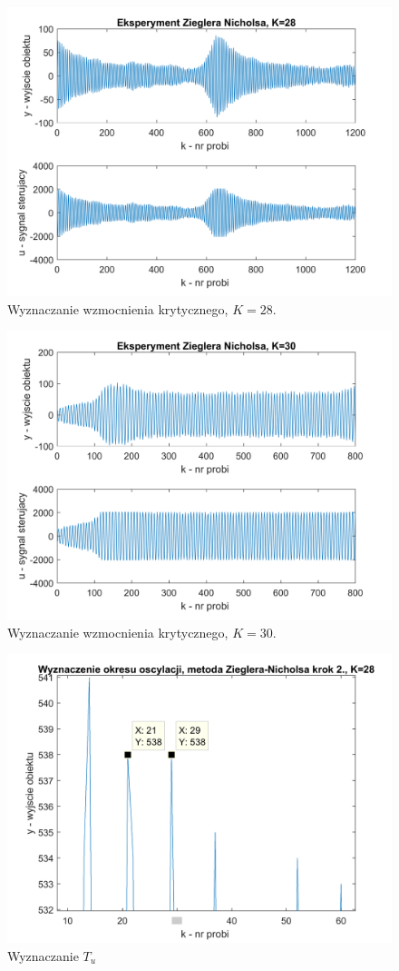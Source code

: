 \documentclass[a4paper, 10pt]{article}
\begin{document}
\begin{figure}[H]
	\centering
	\includegraphics[width=0.9\linewidth]{EZN281}
	\caption{Wyznaczanie wzmocnienia krytycznego, $K = 28$.}
	\label{fig:EZN28}
\end{figure}

\begin{figure}[H]
	\centering
	\includegraphics[width=0.9\linewidth]{EZN30}
	\caption{Wyznaczanie wzmocnienia krytycznego, $K = 30$.}
	\label{fig:EZN30}
\end{figure}

\begin{figure}[H]
	\centering
	\includegraphics[width=0.9\linewidth]{Tkrytyk}
	\caption{Wyznaczanie $T_{u}$}
	\label{fig:Tkrytyk}
\end{figure}
\end{document}
